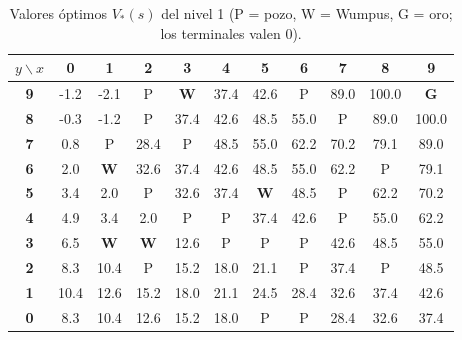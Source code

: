 \documentclass[11pt,letterpaper]{article}
\begin{document}
\begin{table}[H]
\centering
\footnotesize
\setlength{\tabcolsep}{3.5pt}
\caption{Valores óptimos $V_*(s)$ del nivel 1 (P = pozo, W = Wumpus, G = oro; los terminales valen 0).}
\label{tab:vstar}
\begin{tabular}{c|cccccccccc}
$y \backslash x$ & 0 & 1 & 2 & 3 & 4 & 5 & 6 & 7 & 8 & 9 \\
\hline
\textbf{9} & -1.2 & -2.1 & \textcolor{ibero}{P} & \textcolor{ibero}{\textbf{W}} & 37.4 & 42.6 & \textcolor{ibero}{P} & 89.0 & 100.0 & \textcolor{oro}{\textbf{G}} \\
\textbf{8} & -0.3 & -1.2 & \textcolor{ibero}{P} & 37.4 & 42.6 & 48.5 & 55.0 & \textcolor{ibero}{P} & 89.0 & 100.0 \\
\textbf{7} & 0.8 & \textcolor{ibero}{P} & 28.4 & \textcolor{ibero}{P} & 48.5 & 55.0 & 62.2 & 70.2 & 79.1 & 89.0 \\
\textbf{6} & 2.0 & \textcolor{ibero}{\textbf{W}} & 32.6 & 37.4 & 42.6 & 48.5 & 55.0 & 62.2 & \textcolor{ibero}{P} & 79.1 \\
\textbf{5} & 3.4 & 2.0 & \textcolor{ibero}{P} & 32.6 & 37.4 & \textcolor{ibero}{\textbf{W}} & 48.5 & \textcolor{ibero}{P} & 62.2 & 70.2 \\
\textbf{4} & 4.9 & 3.4 & 2.0 & \textcolor{ibero}{P} & \textcolor{ibero}{P} & 37.4 & 42.6 & \textcolor{ibero}{P} & 55.0 & 62.2 \\
\textbf{3} & 6.5 & \textcolor{ibero}{\textbf{W}} & \textcolor{ibero}{\textbf{W}} & 12.6 & \textcolor{ibero}{P} & \textcolor{ibero}{P} & \textcolor{ibero}{P} & 42.6 & 48.5 & 55.0 \\
\textbf{2} & 8.3 & 10.4 & \textcolor{ibero}{P} & 15.2 & 18.0 & 21.1 & \textcolor{ibero}{P} & 37.4 & \textcolor{ibero}{P} & 48.5 \\
\textbf{1} & 10.4 & 12.6 & 15.2 & 18.0 & 21.1 & 24.5 & 28.4 & 32.6 & 37.4 & 42.6 \\
\textbf{0} & 8.3 & 10.4 & 12.6 & 15.2 & 18.0 & \textcolor{ibero}{P} & \textcolor{ibero}{P} & 28.4 & 32.6 & 37.4 \\
\end{tabular}
\end{table}
\end{document}
